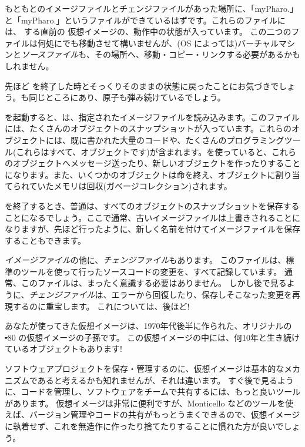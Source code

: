 \documentclass[a4paper,10pt,twoside]{book}
\begin{document}
もともとのイメージファイルとチェンジファイルがあった場所に、「myPharo.」と「myPharo.」というファイルができているはずです。これらのファイルには、 する直前の \pharo 仮想イメージの、動作中の状態が入っています。
この二つのファイルは何処にでも移動させて構いませんが、(OS によっては)バーチャルマシンと\emph{ソースファイル}も、その場所へ、移動・コピー・リンクする必要があるかもしれません。


先ほど \pharo を終了した時とそっくりそのままの状態に戻ったことにお気づきでしょう。\bam も同じところにあり、原子も弾み続けているでしょう。

\pharo を起動すると、\pharo {}は、指定されたイメージファイルを読み込みます。このファイルには、たくさんのオブジェクトのスナップショットが入っています。これらのオブジェクトには、既に書かれた大量のコードや、たくさんのプログラミングツール(これらはすべて、オブジェクトです)が含まれます。\pharo を使っていると、これらのオブジェクトへメッセージ送ったり、新しいオブジェクトを作ったりすることになります。また、いくつかのオブジェクトは命を終え、オブジェクトに割り当てられていたメモリは回収(\ie ガベージコレクション)されます。

\pharo を終了するとき、普通は、すべてのオブジェクトのスナップショットを保存することになるでしょう。ここで通常、古いイメージファイルは上書きされることになりますが、先ほど行ったように、新しく名前を付けてイメージファイルを保存することもできます。

\emph{イメージファイル}の他に、\emph{チェンジファイル}もあります。
このファイルは、標準のツールを使って行ったソースコードの変更を、すべて記録しています。
通常、このファイルは、まったく意識する必要はありません。
しかし後で見るように、\emph{チェンジファイル}は、エラーから回復したり、保存しそこなった変更を再現するのに重宝します。
これについては、後ほど!

あなたが使ってきた仮想イメージは、1970年代後半に作られた、オリジナルの \st-80 の仮想イメージの子孫です。
この仮想イメージの中には、何10年と生き続けているオブジェクトもあります!

ソフトウェアプロジェクトを保存・管理するのに、仮想イメージは基本的なメカニズムであると考えるかも知れませんが、それは違います。
すぐ後で見るように、コードを管理し、ソフトウェアをチームで共有するには、もっと良いツールがあります。
仮想イメージは非常に便利ですが、Monticello などのツールを使えば、バージョン管理やコードの共有がもっとうまくできるので、仮想イメージに執着せず、これを無造作に作ったり捨てたりすることに慣れた方が良いでしょう。
\end{document}
